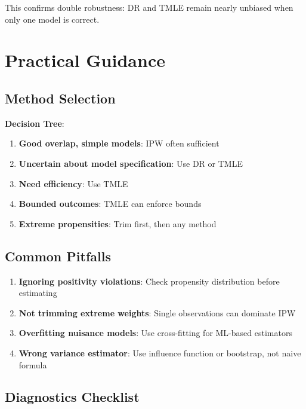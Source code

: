 This confirms double robustness: DR and TMLE remain nearly unbiased when only one model is correct.

\section{Practical Guidance}
\label{sec:weighting_guidance}

\subsection{Method Selection}

\medskip
\noindent\textbf{Decision Tree}:
\begin{enumerate}
    \item \textbf{Good overlap, simple models}: IPW often sufficient
    \item \textbf{Uncertain about model specification}: Use DR or TMLE
    \item \textbf{Need efficiency}: Use TMLE
    \item \textbf{Bounded outcomes}: TMLE can enforce bounds
    \item \textbf{Extreme propensities}: Trim first, then any method
\end{enumerate}

\subsection{Common Pitfalls}

\begin{enumerate}
    \item \textbf{Ignoring positivity violations}: Check propensity distribution before estimating
    \item \textbf{Not trimming extreme weights}: Single observations can dominate IPW
    \item \textbf{Overfitting nuisance models}: Use cross-fitting for ML-based estimators
    \item \textbf{Wrong variance estimator}: Use influence function or bootstrap, not naive formula
\end{enumerate}

\subsection{Diagnostics Checklist}

